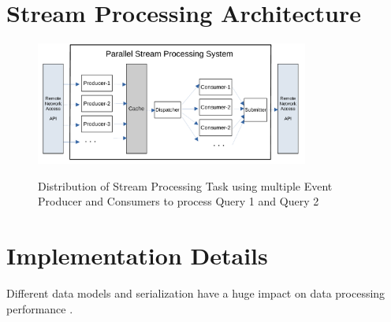 \section{Stream Processing Architecture}\label{sec:concepts}


\begin{figure}[!ht]
    \begin{center}
        \includegraphics[width=0.8\textwidth]{./images/Parallel-Stream-Processing-System}
        \label{fig:parallel-srream-processing}
        \caption{Distribution of Stream Processing Task using multiple Event Producer and Consumers to process Query 1 and Query 2 }
    \end{center}
\end{figure}



\section{Implementation Details}\label{sec:implementation}



Different data models and serialization have a huge impact on data processing performance \cite{DBLP:conf/cloud/SikdarTJ17}. 





